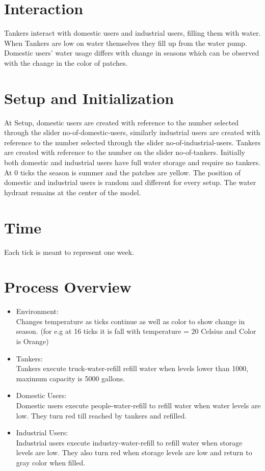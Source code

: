 \documentclass{article}
\begin{document}
\section*{Interaction}
Tankers interact with domestic users and industrial users, filling them with water. When Tankers are low on water themselves they fill up from the water pump. Domestic users’ water usage differs with change in seasons which can be observed with the change in the color of patches. 

\section*{Setup and Initialization}
At Setup, domestic users are created with reference to the number selected through the slider no-of-domestic-users, similarly industrial users are created with reference to the number selected through the slider no-of-industrial-users. Tankers are created with reference to the number on the slider no-of-tankers. Initially both domestic and industrial users have full water storage and require no tankers. At 0 ticks the season is summer and the patches are yellow. The position of domestic and industrial users is random and different for every setup. The water hydrant remains at the center of the model.

\section*{Time}
Each tick is meant to represent one week. 

\section*{Process Overview}
\begin{itemize}
    \item Environment: \\
Changes temperature as ticks continue as well as color to show change in season. (for e.g at 16 ticks it is fall with temperature = 20 Celsius and Color is Orange)
    \item Tankers: \\
Tankers execute truck-water-refill refill water when levels lower than 1000, maximum capacity is 5000 gallons. 
    \item Domestic Users: \\
Domestic users execute people-water-refill to refill water when water levels are low. They turn red till reached by tankers and refilled.
    \item Industrial Users: \\
Industrial users execute industry-water-refill to refill water when storage levels are low. They also turn red when storage levels are low and return to gray color when filled. 
\end{itemize}  
\end{document}
